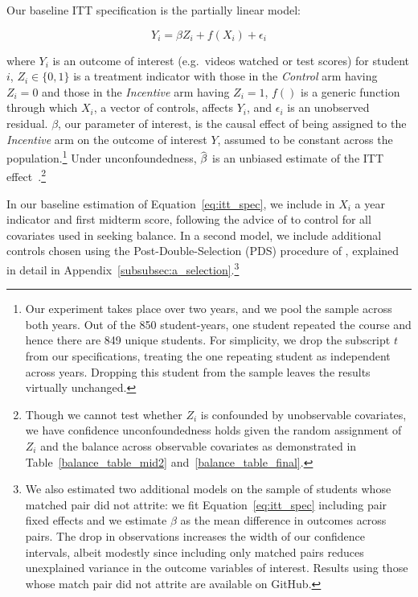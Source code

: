 \documentclass[12pt]{article}
\newcommand\wh[1]{\hstretch{2}{\hat{\hstretch{.5}{#1}}}}
\begin{document}
Our baseline ITT specification is the partially linear model:

\begin{equation} \label{eq:itt_spec}
	Y_i = \beta Z_i + f(X_i) + \epsilon_i
\end{equation}

where $Y_i$ is an outcome of interest (e.g.\ videos watched or test scores) for student $i$, $Z_i \in \{0,1\}$ is a treatment indicator with those in the \textit{Control} arm having $Z_i=0$ and those in the \textit{Incentive} arm having $Z_i=1$, $f()$ is a generic function through which $X_i$, a vector of controls, affects $Y_i$, and $\epsilon_i$ is an unobserved residual. $\beta$, our parameter of interest, is the causal effect of being assigned to the \textit{Incentive} arm on the outcome of interest $Y$, assumed to be constant across the population.\footnote{Our experiment takes place over two years, and we pool the sample across both years. Out of the 850 student-years, one student repeated the course and hence there are 849 unique students. For simplicity, we drop the subscript $t$ from our specifications, treating the one repeating student as independent across years. Dropping this student from the sample leaves the results virtually unchanged.} Under unconfoundedness, $\wh{\beta}$ is an unbiased estimate of the ITT effect~\parencite{ir2015}.\footnote{Though we cannot test whether $Z_i$ is confounded by unobservable covariates, we have confidence unconfoundedness holds given the random assignment of $Z_i$ and the balance across observable covariates as demonstrated in Table~\ref{balance_table_mid2} and~\ref{balance_table_final}.}

In our baseline estimation of Equation~\ref{eq:itt_spec}, we include in $X_i$ a year indicator and first midterm score, following the advice of \textcite{bm2009} to control for all covariates used in seeking balance.
In a second model, we include additional controls chosen using the Post-Double-Selection (PDS) procedure of \textcite{bch2014a}, explained in detail in Appendix~\ref{subsubsec:a_selection}.\footnote{We also estimated two additional models on the sample of students whose matched pair did not attrite:  we fit Equation~\ref{eq:itt_spec} including pair fixed effects and we estimate $\beta$ as the mean difference in outcomes across pairs. The drop in observations increases the width of our confidence intervals, albeit modestly since including only matched pairs reduces unexplained variance in the outcome variables of interest. Results using those whose match pair did not attrite are available on GitHub.}
\end{document}

